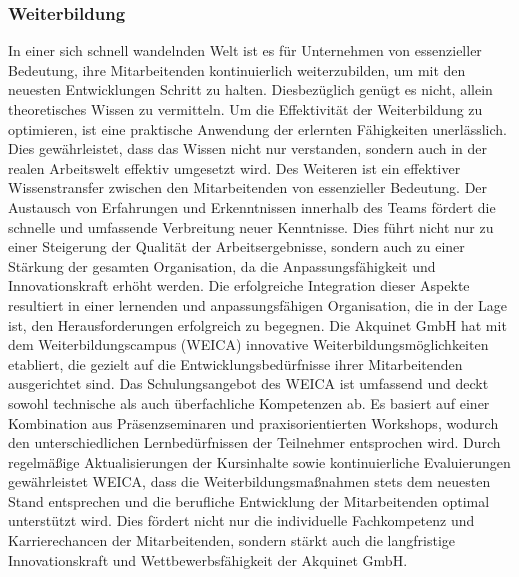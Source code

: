 \subsubsection{Weiterbildung}\label{sec:weiterbildung}
In einer sich schnell wandelnden Welt ist es für Unternehmen von essenzieller Bedeutung, ihre Mitarbeitenden kontinuierlich weiterzubilden, um mit den neuesten Entwicklungen Schritt zu halten. Diesbezüglich genügt es nicht, allein theoretisches Wissen zu vermitteln.\cite{weiterbildungintro}\newline
Um die Effektivität der Weiterbildung zu optimieren, ist eine praktische Anwendung der erlernten Fähigkeiten unerlässlich. Dies gewährleistet, dass das Wissen nicht nur verstanden, sondern auch in der realen Arbeitswelt effektiv umgesetzt wird.\newline \newline
Des Weiteren ist ein effektiver Wissenstransfer zwischen den Mitarbeitenden von essenzieller Bedeutung. Der Austausch von Erfahrungen und Erkenntnissen innerhalb des Teams fördert die schnelle und umfassende Verbreitung neuer Kenntnisse. Dies führt nicht nur zu einer Steigerung der Qualität der Arbeitsergebnisse, sondern auch zu einer Stärkung der gesamten Organisation, da die Anpassungsfähigkeit und Innovationskraft erhöht werden.\cite{weiterbildungconc}\newline
Die erfolgreiche Integration dieser Aspekte resultiert in einer lernenden und anpassungsfähigen Organisation, die in der Lage ist, den Herausforderungen erfolgreich zu begegnen.\newline \newline
Die Akquinet GmbH hat mit dem Weiterbildungscampus (WEICA) innovative Weiterbildungsmöglichkeiten etabliert, die gezielt auf die Entwicklungsbedürfnisse ihrer Mitarbeitenden ausgerichtet sind. Das Schulungsangebot des WEICA ist umfassend und deckt sowohl technische als auch überfachliche Kompetenzen ab.\newline
Es basiert auf einer Kombination aus Präsenzseminaren und praxisorientierten Workshops, wodurch den unterschiedlichen Lernbedürfnissen der Teilnehmer entsprochen wird. Durch regelmäßige Aktualisierungen der Kursinhalte sowie kontinuierliche Evaluierungen gewährleistet WEICA, dass die Weiterbildungsmaßnahmen stets dem neuesten Stand entsprechen und die berufliche Entwicklung der Mitarbeitenden optimal unterstützt wird.\newline
Dies fördert nicht nur die individuelle Fachkompetenz und Karrierechancen der Mitarbeitenden, sondern stärkt auch die langfristige Innovationskraft und Wettbewerbsfähigkeit der Akquinet GmbH.


